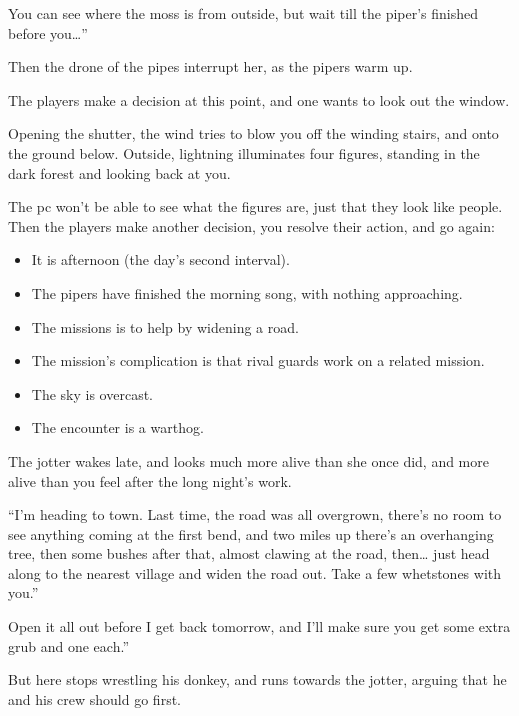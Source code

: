 \begin{multicols}{2}
\begin{boxtext}
  You can see where the moss is from outside, but wait till the piper's finished before you\ldots''

  Then the drone of the pipes interrupt her, as the pipers warm up.
\end{boxtext}

The players make a decision at this point, and one wants to look out the window.

\begin{boxtext}
  Opening the shutter, the wind tries to blow you off the winding stairs, and onto the ground below.
  Outside, lightning illuminates four figures, standing in the dark forest and looking back at you.
\end{boxtext}

The \gls{pc} won't be able to see what the figures are, just that they look like people.
Then the players make another decision, you resolve their action, and go again:

\begin{itemize}
  \item
  It is afternoon (the day's second \gls{interval}).
  \item
  The pipers have finished the morning song, with nothing approaching.
  \item
  The missions is to help  by widening a road.
  \item
  The mission's complication is that rival \glspl{guard} work on a related mission.
  \item
  The sky is overcast.
  \item
  The encounter is a warthog.
\end{itemize}

\begin{boxtext}
  The \gls{jotter} wakes late, and looks much more alive than she once did, and more alive than you feel after the long night's work.

  ``I'm heading to town.
  Last time, the road was all overgrown, there's no room to see anything coming at the first bend, and two miles up there's an overhanging tree, then some bushes after that, almost clawing at the road, then\ldots
  just head along to the nearest \gls{village} and widen the road out.
  Take a few whetstones with you.''

  Open it all out before I get back tomorrow, and I'll make sure you get some extra grub and one  each.''

  But here  stops wrestling his donkey, and runs towards the \gls{jotter}, arguing that he and his crew should go first.


\end{boxtext}
\end{multicols}
